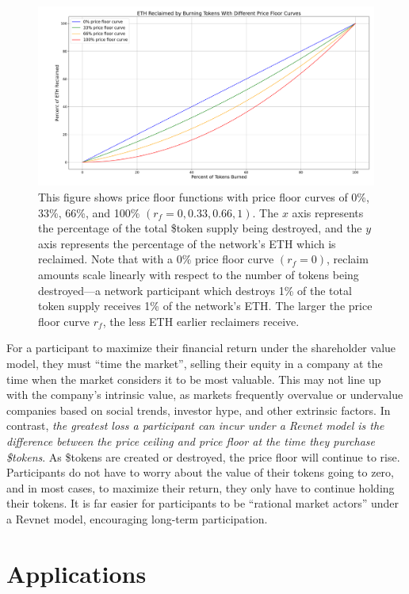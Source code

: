 \documentclass{article}
\begin{document}
\begin{figure}[ht]
  \centering
  \includegraphics[width=\textwidth]{figures/multi-floor-curves.png}
  \caption{This figure shows price floor functions with price floor curves of 0\%, 33\%, 66\%, and 100\% $(r_f = 0, 0.33, 0.66, 1)$. The $x$ axis represents the percentage of the total \$token supply being destroyed, and the $y$ axis represents the percentage of the network's ETH which is reclaimed. Note that with a 0\% price floor curve $(r_f = 0)$, reclaim amounts scale linearly with respect to the number of tokens being destroyed---a network participant which destroys 1\% of the total token supply receives 1\% of the network's ETH. The larger the price floor curve $r_f$, the less ETH earlier reclaimers receive.}
\end{figure}

For a participant to maximize their financial return under the shareholder value model, they must ``time the market'', selling their equity in a company at the time when the market considers it to be most valuable. This may not line up with the company's intrinsic value, as markets frequently overvalue or undervalue companies based on social trends, investor hype, and other extrinsic factors. In contrast, \textit{the greatest loss a participant can incur under a Revnet model is the difference between the price ceiling and price floor at the time they purchase \$tokens}. As \$tokens are created or destroyed, the price floor will continue to rise. Participants do not have to worry about the value of their tokens going to zero, and in most cases, to maximize their return, they only have to continue holding their tokens. It is far easier for participants to be ``rational market actors'' under a Revnet model, encouraging long-term participation.

\section{Applications}
\end{document}
